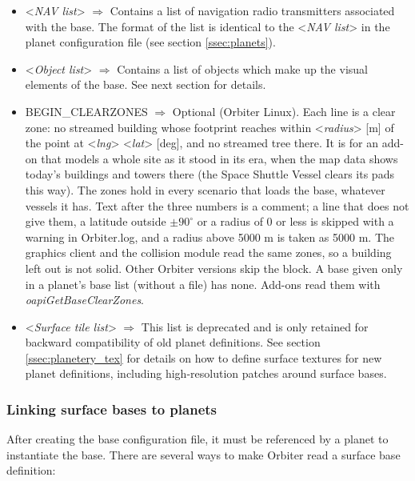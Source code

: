 \documentclass[Orbiter Developer Manual.tex]{subfiles}
\begin{document}
\begin{itemize}
Note: Currently this function is only implemented for a limited number of base object types.
\item <\textit{NAV list}> $\Rightarrow$ Contains a list of navigation radio transmitters associated with the base. The format of the list is identical to the <\textit{NAV list}> in the planet configuration file (see section \ref{ssec:planets}).
\item <\textit{Object list}> $\Rightarrow$ Contains a list of objects which make up the visual elements of the base. See next section for details.
\item BEGIN\_CLEARZONES $\Rightarrow$ Optional (Orbiter Linux). Each line is a clear zone: no streamed building whose footprint reaches within <\textit{radius}> [m] of the point at <\textit{lng}> <\textit{lat}> [deg], and no streamed tree there. It is for an add-on that models a whole site as it stood in its era, when the map data shows today's buildings and towers there (the Space Shuttle Vessel clears its pads this way). The zones hold in every scenario that loads the base, whatever vessels it has. Text after the three numbers is a comment; a line that does not give them, a latitude outside $\pm 90^\circ$ or a radius of 0 or less is skipped with a warning in Orbiter.log, and a radius above 5000 m is taken as 5000 m. The graphics client and the collision module read the same zones, so a building left out is not solid. Other Orbiter versions skip the block. A base given only in a planet's base list (without a file) has none. Add-ons read them with \textit{oapiGetBaseClearZones}.
\item <\textit{Surface tile list}> $\Rightarrow$ This list is deprecated and is only retained for backward compatibility of old planet definitions. See section \ref{ssec:planetery_tex} for details on how to define surface textures for new planet definitions, including high-resolution patches around surface bases.
\end{itemize}


\subsubsection*{Linking surface bases to planets}
After creating the base configuration file, it must be referenced by a planet to instantiate the base. There are several ways to make Orbiter read a surface base definition:
\end{document}
